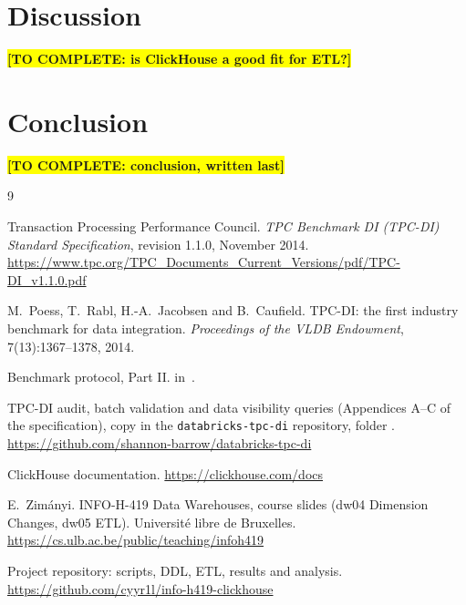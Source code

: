 \documentclass[11pt,a4paper]{article}
\newcommand{\code}[1]{\texttt{#1}}           %
\newcommand{\todo}[1]{\colorbox{yellow}{\textbf{[TO COMPLETE: #1]}}}
\begin{document}
\section{Discussion}
\label{sec:discussion}

\todo{is ClickHouse a good fit for ETL?}

\section{Conclusion}
\label{sec:conclusion}

\todo{conclusion, written last}

\begin{thebibliography}{9}

Transaction Processing Performance Council.
\emph{TPC Benchmark DI (TPC-DI) Standard Specification}, revision 1.1.0, November 2014.
\url{https://www.tpc.org/TPC_Documents_Current_Versions/pdf/TPC-DI_v1.1.0.pdf}

M.~Poess, T.~Rabl, H.-A.~Jacobsen and B.~Caufield.
TPC-DI: the first industry benchmark for data integration.
\emph{Proceedings of the VLDB Endowment}, 7(13):1367--1378, 2014.

Benchmark protocol, Part II.  in~\cite{r7}.

TPC-DI audit, batch validation and data visibility queries (Appendices A--C of the
specification), copy in the \code{databricks-tpc-di} repository,
folder .
\url{https://github.com/shannon-barrow/databricks-tpc-di}

ClickHouse documentation. \url{https://clickhouse.com/docs}

E.~Zimányi. INFO-H-419 Data Warehouses, course slides (dw04 Dimension Changes,
dw05 ETL). Université libre de Bruxelles.
\url{https://cs.ulb.ac.be/public/teaching/infoh419}

Project repository: scripts, DDL, ETL, results and analysis.
\url{https://github.com/cyyr1l/info-h419-clickhouse}

\end{thebibliography}
\end{document}
